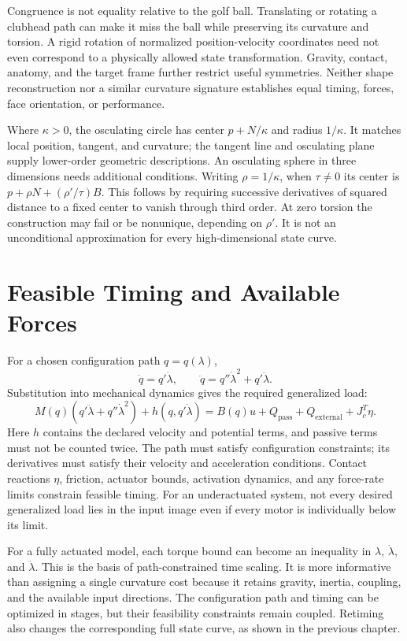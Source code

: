 \documentclass[12pt, openany]{book}
\theoremstyle{plain}
\begin{document}
Congruence is not equality relative to the golf ball. Translating or rotating
a clubhead path can make it miss the ball while preserving its curvature and
torsion. A rigid rotation of normalized position-velocity coordinates need
not even correspond to a physically allowed state transformation. Gravity,
contact, anatomy, and the target frame further restrict useful symmetries.
Neither shape reconstruction nor a similar curvature signature establishes
equal timing, forces, face orientation, or performance.

Where $\kappa>0$, the osculating circle has center $p+N/\kappa$ and radius
$1/\kappa$. It matches local position, tangent, and curvature; the tangent
line and osculating plane supply lower-order geometric descriptions. An
osculating sphere in three dimensions needs additional conditions. Writing
$\rho=1/\kappa$, when $\tau\ne0$ its center is
$p+\rho N+(\rho'/\tau)B$. This follows by requiring successive derivatives
of squared distance to a fixed center to vanish through third order. At
zero torsion the construction may fail or be nonunique, depending on
$\rho'$. It is not an unconditional approximation for every high-dimensional
state curve.

\section{Feasible Timing and Available Forces}

For a chosen configuration path $q=q(\lambda)$,
\begin{equation}
 \dot q=q'\dot\lambda,\qquad
 \ddot q=q''\dot\lambda^2+q'\ddot\lambda.
\end{equation}
Substitution into mechanical dynamics gives the required generalized load:
\begin{equation}\label{eq:curve_path_dynamics}
 M(q)(q'\ddot\lambda+q''\dot\lambda^2)+h(q,q'\dot\lambda)
 =B(q)u+Q_{\mathrm{pass}}+Q_{\mathrm{external}}+J_c^T\eta.
\end{equation}
Here $h$ contains the declared velocity and potential terms, and passive
terms must not be counted twice. The path must satisfy configuration
constraints; its derivatives must satisfy their velocity and acceleration
conditions. Contact reactions $\eta$, friction, actuator bounds, activation
dynamics, and any force-rate limits constrain feasible timing. For an
underactuated system, not every desired generalized load lies in the input
image even if every motor is individually below its limit.

For a fully actuated model, each torque bound can become an inequality in
$\lambda$, $\dot\lambda$, and $\ddot\lambda$. This is the basis of
path-constrained time scaling. It is more informative than assigning a
single curvature cost because it retains gravity, inertia, coupling, and
the available input directions. The configuration path and timing can be
optimized in stages, but their feasibility constraints remain coupled.
Retiming also changes the corresponding full state curve, as shown in the
previous chapter.
\end{document}
